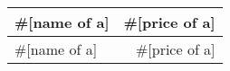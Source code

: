 \documentclass{article}
\begin{document}
\begin{center}
\begin{tabular}{ l r }
\hline
#[name of a] & #[price of a] \\ \hline
#[name of a] & #[price of a] \\ \hline
\hline
\end{tabular}
\end{center}
\end{document}
